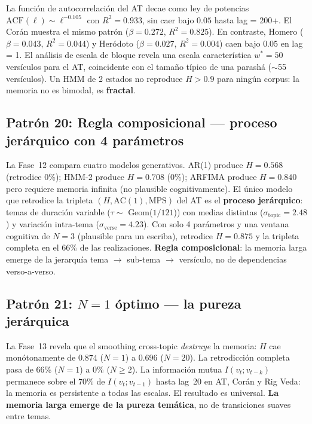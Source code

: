 \documentclass[12pt,a4paper]{article}
\begin{document}
La funci\'on de autocorrelaci\'on del AT decae como ley de potencias
$\text{ACF}(\ell) \sim \ell^{-0.105}$ con $R^2 = 0.933$, sin caer bajo
$0.05$ hasta lag = 200+. El Cor\'an muestra el mismo patr\'on ($\beta = 0.272$,
$R^2 = 0.825$). En contraste, Homero ($\beta = 0.043$, $R^2 = 0.044$) y
Her\'odoto ($\beta = 0.027$, $R^2 = 0.004$) caen bajo $0.05$ en lag = 1.
El an\'alisis de escala de bloque revela una escala caracter\'istica
$w^* = 50$ vers\'iculos para el AT, coincidente con el tama\~no t\'ipico
de una parash\'a ($\sim$55 vers\'iculos). Un HMM de 2 estados no reproduce
$H > 0.9$ para ning\'un corpus: la memoria no es bimodal, es \textbf{fractal}.

\subsection{Patr\'on 20: Regla composicional --- proceso jer\'arquico con 4 par\'ametros}

La Fase~12 compara cuatro modelos generativos. AR(1) produce $H = 0.568$
(retrodice 0\%); HMM-2 produce $H = 0.708$ (0\%); ARFIMA produce $H = 0.840$
pero requiere memoria infinita (no plausible cognitivamente). El \'unico
modelo que retrodice la tripleta $(H, \text{AC}(1), \text{MPS})$ del AT es
el \textbf{proceso jer\'arquico}: temas de duraci\'on variable ($\tau \sim$
Geom($1/121$)) con medias distintas ($\sigma_{\text{topic}} = 2.48$) y
variaci\'on intra-tema ($\sigma_{\text{verse}} = 4.23$). Con solo 4 par\'ametros
y una ventana cognitiva de $N = 3$ (plausible para un escriba), retrodice
$H = 0.875$ y la tripleta completa en el 66\% de las realizaciones.
\textbf{Regla composicional}: la memoria larga emerge de la jerarqu\'ia
tema $\to$ sub-tema $\to$ vers\'iculo, no de dependencias verso-a-verso.

\subsection{Patr\'on 21: $N = 1$ \'optimo --- la pureza jer\'arquica}

La Fase~13 revela que el smoothing cross-topic \emph{destruye} la memoria:
$H$ cae mon\'otonamente de $0.874$ ($N = 1$) a $0.696$ ($N = 20$).
La retrodicci\'on completa pasa de 66\% ($N = 1$) a 0\% ($N \geq 2$).
La informaci\'on mutua $I(v_t; v_{t-k})$ permanece sobre el 70\% de
$I(v_t; v_{t-1})$ hasta lag~20 en AT, Cor\'an y Rig Veda: la memoria
es persistente a todas las escalas. El resultado es universal.
\textbf{La memoria larga emerge de la pureza tem\'atica}, no de transiciones
suaves entre temas.
\end{document}

